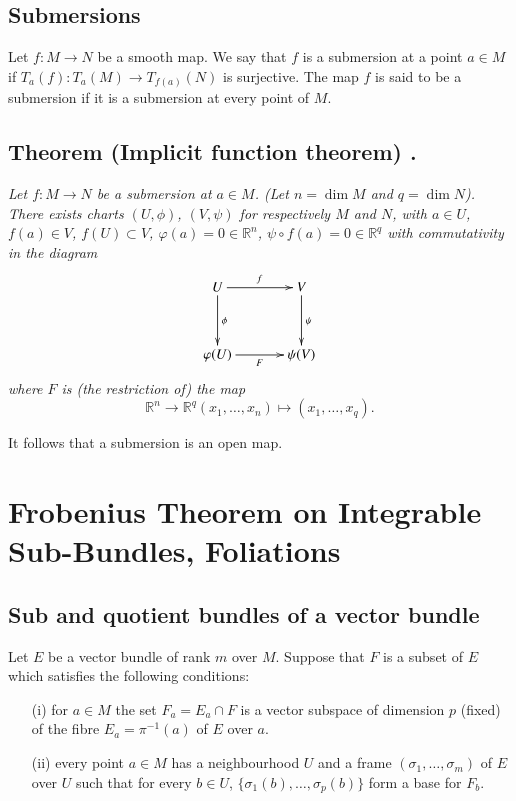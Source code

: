 \eject

\subsection*{Submersions}

Let $f:M\to N$ be a smooth map. We say that $f$ is a submersion at a point $a\in M$ if $T_{a}(f):T_{a}(M)\to T_{f(a)}(N)$ is surjective. The map $f$ is said to be a submersion if it is a submersion at every point of $M$.

\subsection*{Theorem (Implicit function theorem) .\label{sec7-thm7.2}}

{\em Let $f:M\to N$ be a submersion at $a\in M$. (Let $n=\dim M$ and $q=\dim N$). There exists charts $(U,\phi)$, $(V,\psi)$ for respectively $M$ and $N$, with $a\in U$, $f(a)\in V$, $f(U)\subset V$, $\varphi(a)=0\in \mathbb{R}^{n}$, $\psi\circ f(a)=0\in \mathbb{R}^{q}$ with commutativity in the diagram}
\[
\xymatrix@=1.2cm{
U\ar[d]^{\phi}\ar[r]^{f} & V\ar[d]^{\psi}\\
\varphi(U)\ar[r]_{F} & \psi(V)
}
\]
{\em where $F$ is (the restriction of) the map }
$$
\mathbb{R}^{n}\to \mathbb{R}^{q}(x_{1},\ldots,x_{n})\mapsto (x_{1},\ldots,x_{q}).
$$

It follows that a submersion is an open map.

\section{Frobenius Theorem on Integrable Sub-Bundles, Foliations}\label{sec8}

\subsection*{Sub and quotient bundles of a vector bundle}\pageoriginale

Let $E$ be a vector bundle of rank $m$ over $M$. Suppose that $F$ is a subset of $E$ which satisfies the following conditions:
\begin{itemize}
\item[(i)] for $a\in M$ the set $F_{a}=E_{a}\cap F$ is a vector subspace of dimension $p$ (fixed) of the fibre $E_{a}=\pi^{-1}(a)$ of $E$ over $a$.

\item[(ii)] every point $a\in M$ has a neighbourhood $U$ and a frame $(\sigma_{1},\ldots,\sigma_{m})$ of $E$ over $U$ such that for every $b\in U$, $\{\sigma_{1}(b),\ldots,\sigma_{p}(b)\}$ form a base for $F_{b}$.
\end{itemize}

